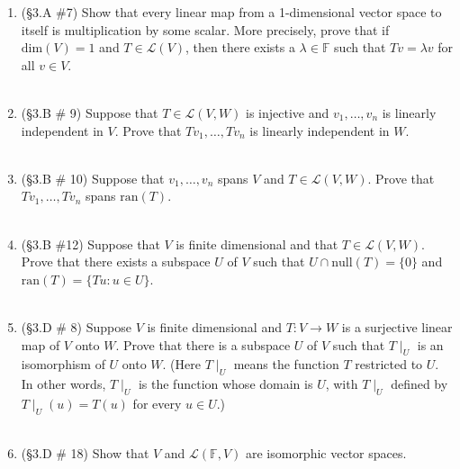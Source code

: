 \documentclass[12pt,letterpaper]{article}
\theoremstyle{plain}
\theoremstyle{definition}
\begin{document}
\begin{enumerate}[1.]
\item (\S 3.A \#7) Show that every linear map from a 1-dimensional vector space to itself is multiplication by some scalar. More precisely, prove that if $\text{dim}(V)=1$ and $T\in \mathcal{L}(V)$, then there exists a $\lambda \in \mathbb{F}$ such that $Tv=\lambda v$ for all $v\in V$.\\
\ \\
\item (\S 3.B \# 9) Suppose that $T\in \mathcal{L}(V,W)$ is injective and $v_1, \ldots ,v_n$ is linearly independent in $V$. Prove that $Tv_1,\ldots, Tv_n$ is linearly independent in $W$. \\
\ \\
\item (\S 3.B \# 10) Suppose that $v_1, \ldots, v_n$ spans $V$ and $T\in \mathcal{L}(V,W)$. Prove that $Tv_1, \ldots ,Tv_n$ spans $\text{ran}(T)$. \\
\ \\
\item (\S 3.B \#12) Suppose that $V$ is finite dimensional and that $T\in \mathcal{L}(V,W)$. Prove that there exists a subspace $U$ of $V$ such that $U\cap \text{null}(T)=\{0\}$ and $\text{ran}(T)=\{Tu : u\in U\}$.\\
\ \\
\item (\S 3.D \# 8) Suppose $V$ is finite dimensional and $T:V\rightarrow W$ is a surjective linear map of $V$ onto $W$. Prove that there is a subspace $U$ of $V$ such that $T\mid_U$ is an isomorphism of $U$ onto $W$. (Here $T\mid_U$ means the function $T$ restricted to $U$. In other words, $T\mid_U$ is the function whose domain is $U$, with $T\mid_U$ defined by $T\mid_U(u)=T(u)$ for every $u\in U$.)\\
\ \\
\item (\S 3.D \# 18) Show that $V$ and $\mathcal{L}(\mathbb{F},V)$ are isomorphic vector spaces. 
\end{enumerate}
\end{document}
